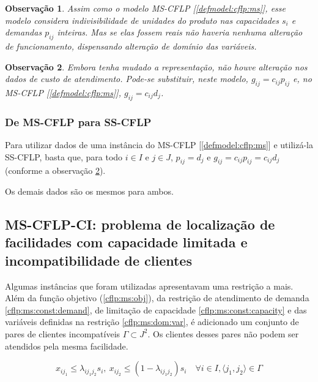\documentclass[]{article}
\newtheorem{observation}{Observação}
\begin{document}
 			\begin{observation} \label{cflp:ss:obs:int}
 				Assim como o modelo MS-CFLP [\ref{defmodel:cflp:ms}], esse modelo considera indivisibilidade de unidades do produto nas capacidades $s_i$ e demandas $p_{ij}$ inteiras. 
 				Mas se elas fossem reais não haveria nenhuma alteração de funcionamento, dispensando alteração de domínio das variáveis.
 			\end{observation}
 		
 			\begin{observation} \label{cflp:ss:obs:gc} 
 				Embora tenha mudado a representação, não houve alteração nos dados de custo de atendimento. 
 				Pode-se substituir, neste modelo, $g_{ij} = c_{ij} p_{ij}$ e, no MS-CFLP [\ref{defmodel:cflp:ms}], $g_{ij} = c_{ij} d_j$.
 			\end{observation}
 		
 			\subsubsection{De MS-CFLP para SS-CFLP} \label{defmodel:cflp:ms:ss}
 				Para utilizar dados de uma instância do MS-CFLP [\ref{defmodel:cflp:ms}] e utilizá-la SS-CFLP, basta que, para todo $i \in I$ e $j \in J$, $p_{ij} = d_j$ e $g_{ij} = c_{ij} p_{ij} = c_{ij} d_j$ (conforme a observação \ref{cflp:ss:obs:gc}).
 				
 				Os demais dados são os mesmos para ambos. 
 				
 				
 		\subsection{MS-CFLP-CI: problema de localização de facilidades com capacidade limitada e incompatibilidade de clientes} \label{defmodel:cflp:ci}	
 		
 			Algumas instâncias que foram utilizadas apresentavam uma restrição a mais.
 			Além da função objetivo (\ref{cflp:ms:obj}), da restrição de atendimento de demanda \ref{cflp:ms:const:demand}, de limitação de capacidade \ref{cflp:ms:const:capacity} e das variáveis definidas na restrição \ref{cflp:ms:dom:var}, é adicionado um conjunto de pares de clientes incompatíveis $\Gamma \subset J^2$. 
 			Os clientes desses pares não podem ser atendidos pela mesma facilidade.
 			
 			\begin{equation}
 				\label{cflp:ms:ci:const:incomp}		
 					x_{ij_1} \le \lambda_{ij_1j_2} s_i, 
 					\ x_{ij_2} \le (1 - \lambda_{ij_1j_2}) s_i 
 					\quad
 					\forall i \in I, \langle j_1, j_2 \rangle \in \Gamma  				
 			\end{equation} 
 		
\end{document}
